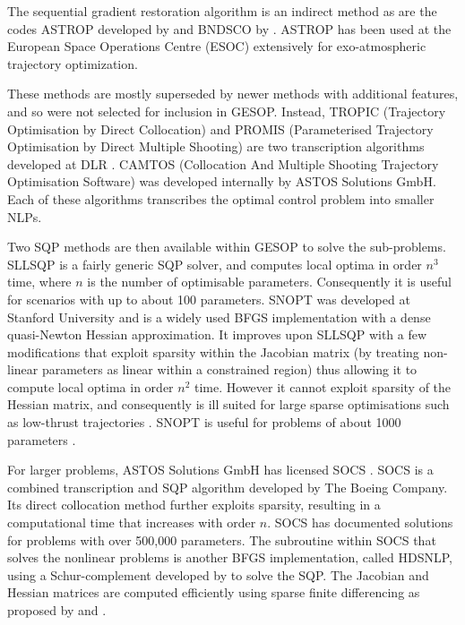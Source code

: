The sequential gradient restoration algorithm \parencite[SGRA, ][]{Miele1975} is an indirect method as are the codes ASTROP developed by \textcite{Bartholomew-Biggs1988} and BNDSCO by \textcite{Bulirsch1971}. ASTROP has been used at the European Space Operations Centre (ESOC) extensively for exo-atmospheric trajectory optimization. 

These methods are mostly superseded by newer methods with additional features, and so were not selected for inclusion in GESOP. Instead, TROPIC (Trajectory Optimisation by Direct Collocation) and PROMIS (Parameterised Trajectory Optimisation by Direct Multiple Shooting) are two transcription algorithms developed at DLR \parencite{Jansch1990}. %
CAMTOS (Collocation And Multiple Shooting Trajectory Optimisation Software) was developed internally by ASTOS Solutions GmbH. Each of these algorithms transcribes the optimal control problem into smaller NLPs. 

Two SQP methods are then available within GESOP to solve the sub-problems. SLLSQP is a fairly generic SQP solver, and computes local optima in order $n^{3}$ time, where $n$ is the number of optimisable parameters. Consequently it is useful for scenarios with up to about 100 parameters. SNOPT \parencite[Sparse Nonlinear Optimizer, ][]{Gill1997} was developed at Stanford University and is a widely used BFGS implementation with a dense quasi-Newton Hessian approximation. It improves upon SLLSQP with a few modifications that exploit sparsity within the Jacobian matrix (by treating non-linear parameters as linear within a constrained region) thus allowing it to compute local optima in order $n^{2}$ time. However it cannot exploit sparsity of the Hessian matrix, and consequently is ill suited for large sparse optimisations such as low-thrust trajectories \parencite{Betts2002}. SNOPT is useful for problems of about 1000 parameters \parencite{ASTOS_guide}.

For larger problems, ASTOS Solutions GmbH has licensed SOCS \parencite[Sparse Optimal Control Software, ][]{SOCS_guide}. SOCS is a combined transcription and SQP algorithm developed by The Boeing Company. Its direct collocation method further exploits sparsity, resulting in a computational time that increases with order $n$. SOCS has documented solutions for problems with over 500,000 parameters. The subroutine within SOCS that solves the nonlinear problems is another BFGS implementation, called HDSNLP, using a Schur-complement developed by \textcite{Gill1987} to solve the SQP. The Jacobian and Hessian matrices are computed efficiently using sparse finite differencing as proposed by \textcite{Curtis1974} and \textcite{Coleman1983}.

